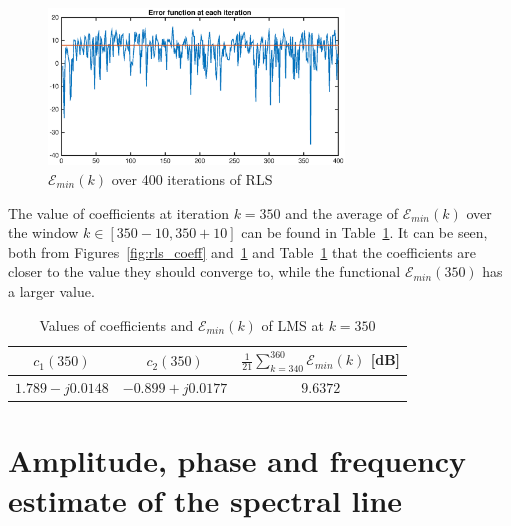 \documentclass[10pt]{article}
\numberwithin{equation}{section}
\begin{document}
\begin{figure}[h!]
  \centering
  \includegraphics[width = 0.7\textwidth]{images/rls_err}
  \caption{$\mathcal{E}_{min}(k)$ over 400 iterations of RLS}
  \label{fig:err_rls}
\end{figure}

The value of coefficients at iteration $k = 350$ and the average of $\mathcal{E}_{min}(k)$ over the window $k \in [350 - 10, 350 + 10]$ can be found in Table~\ref{table:rls_conv}. It can be seen, both from Figures~\ref{fig:rls_coeff} and~\ref{fig:err_rls} and Table~\ref{table:rls_conv} that the coefficients are closer to the value they should converge to, while the functional $\mathcal{E}_{min}(350)$ has a larger value.

\begin{table}[h!]
  \centering
  \begin{tabular}{c|c|c}
    $c_1(350)$ &   $c_2(350)$ & $\frac{1}{21}\sum_{k=340}^{360} \mathcal{E}_{min}(k)$ [dB] \\ \hline
    $1.789 - j0.0148$ & $-0.899 + j0.0177$ & $9.6372$
  \end{tabular}
  \caption{Values of coefficients and $\mathcal{E}_{min}(k)$ of LMS at $k=350$}
  \label{table:rls_conv}
\end{table}

\section{Amplitude, phase and frequency estimate of the spectral line}
\end{document}

